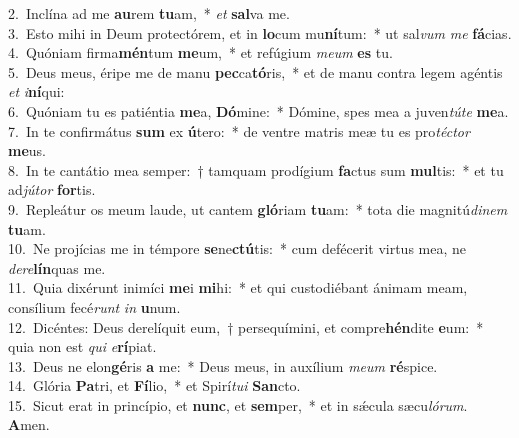 {2.~}Inclína ad me \textbf{au}rem \textbf{tu}am,~* \textit{et} \textbf{sal}va me.\\
{3.~}Esto mihi in Deum protectórem, et in \textbf{lo}cum mu\textbf{ní}tum:~* ut sal\textit{vum} \textit{me} \textbf{fá}cias.\\
{4.~}Quóniam firma\textbf{mén}tum \textbf{me}um,~* et refúgium \textit{me}\textit{um} \textbf{es} tu.\\
{5.~}Deus meus, éripe me de manu \textbf{pec}ca\textbf{tó}ris,~* et de manu contra legem agéntis \textit{et} \textit{i}\textbf{ní}qui:\\
{6.~}Quóniam tu es patiéntia \textbf{me}a, \textbf{Dó}mine:~* Dómine, spes mea a juven\textit{tú}\textit{te} \textbf{me}a.\\
{7.~}In te confirmátus \textbf{sum} ex \textbf{ú}tero:~* de ventre matris meæ tu es pro\textit{té}\textit{ctor} \textbf{me}us.\\
{8.~}In te cantátio mea semper:~† tamquam prodígium \textbf{fa}ctus sum \textbf{mul}tis:~* et tu ad\textit{jú}\textit{tor} \textbf{for}tis.\\
{9.~}Repleátur os meum laude, ut cantem \textbf{gló}riam \textbf{tu}am:~* tota die magnitú\textit{di}\textit{nem} \textbf{tu}am.\\
{10.~}Ne projícias me in témpore \textbf{se}ne\textbf{ctú}tis:~* cum defécerit virtus mea, ne \textit{de}\textit{re}\textbf{lín}quas me.\\
{11.~}Quia dixérunt inimíci \textbf{me}i \textbf{mi}hi:~* et qui custodiébant ánimam meam, consílium fecé\textit{runt} \textit{in} \textbf{u}num.\\
{12.~}Dicéntes: Deus derelíquit eum,~† persequímini, et compre\textbf{hén}dite \textbf{e}um:~* quia non est \textit{qui} \textit{e}\textbf{rí}piat.\\
{13.~}Deus ne elon\textbf{gé}ris \textbf{a} me:~* Deus meus, in auxílium \textit{me}\textit{um} \textbf{ré}spice.\\
{14.~}Glória \textbf{Pa}tri, et \textbf{Fí}lio,~* et Spirí\textit{tu}\textit{i} \textbf{San}cto.\\
{15.~}Sicut erat in princípio, et \textbf{nunc}, et \textbf{sem}per,~* et in sǽcula sæcu\textit{ló}\textit{rum}. \textbf{A}men.\\

